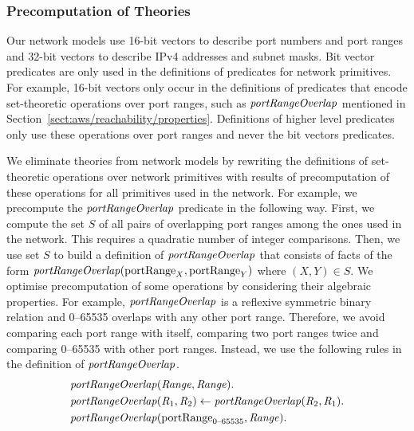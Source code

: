 
\subsubsection*{Precomputation of Theories}
Our network models use 16-bit vectors to describe port numbers and port ranges and 32-bit vectors to describe IPv4 addresses and subnet masks. Bit vector predicates are only used in the definitions of predicates for network primitives. For example, 16-bit vectors only occur in the definitions of predicates that encode set-theoretic operations over port ranges, such as $\mathit{portRangeOverlap}$ mentioned in Section~\ref{sect:aws/reachability/properties}. Definitions of higher level predicates only use these operations over port ranges and never the bit vectors predicates.

We eliminate theories from network models by rewriting the definitions of set-theoretic operations over network primitives with results of precomputation of these operations for all primitives used in the network. For example, we precompute the $\mathit{portRangeOverlap}$ predicate in the following way. First, we compute the set $S$ of all pairs of overlapping port ranges among the ones used in the network. This requires a quadratic number of integer comparisons. Then, we use set $S$ to build a definition of $\mathit{portRangeOverlap}$ that consists of facts of the form $\mathit{portRangeOverlap}(\mathrm{portRange}_X,\mathrm{portRange}_Y)$ where $(X,Y)\in S$. We optimise precomputation of some operations by considering their algebraic properties. For example, $\mathit{portRangeOverlap}$ is a reflexive symmetric binary relation and 0--65535 overlaps with any other port range. Therefore, we avoid comparing each port range with itself, comparing two port ranges twice and comparing 0--65535 with other port ranges. Instead, we use the following rules in the definition of $\mathit{portRangeOverlap}$.
\begin{equation}\label{eq:aws/port-range-algebraic}
\begin{aligned}
&\mathit{portRangeOverlap}(\mathit{Range},\mathit{Range}).\\
&\mathit{portRangeOverlap}(\mathit{R}_1,\mathit{R}_2)\leftarrow\mathit{portRangeOverlap}(\mathit{R}_2,\mathit{R}_1).\\
&\mathit{portRangeOverlap}(\mathrm{portRange}_\text{0--65535},\mathit{Range}).
\end{aligned}
\end{equation}

